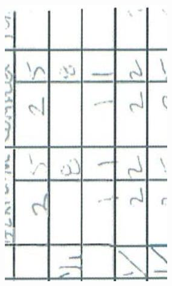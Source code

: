 \documentclass[10pt]{article}
\begin{document}
\includegraphics[max width=\textwidth, center]{2025_02_27_dd68c3d38de88f0516d9g-019(2)}\\
\end{document}
